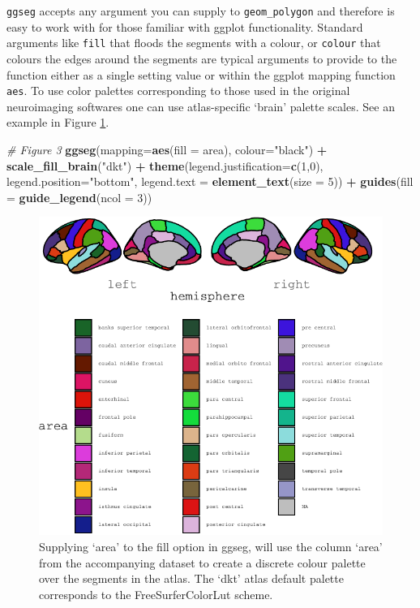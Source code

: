 \documentclass[fleqn,10pt]{wlpeerj} %
\newenvironment{Shaded}{\begin{snugshade}}{\end{snugshade}}
\newcommand{\CommentTok}[1]{\textcolor[rgb]{0.56,0.35,0.01}{\textit{#1}}}
\newcommand{\DataTypeTok}[1]{\textcolor[rgb]{0.13,0.29,0.53}{#1}}
\newcommand{\DecValTok}[1]{\textcolor[rgb]{0.00,0.00,0.81}{#1}}
\newcommand{\KeywordTok}[1]{\textcolor[rgb]{0.13,0.29,0.53}{\textbf{#1}}}
\newcommand{\NormalTok}[1]{#1}
\newcommand{\OperatorTok}[1]{\textcolor[rgb]{0.81,0.36,0.00}{\textbf{#1}}}
\newcommand{\StringTok}[1]{\textcolor[rgb]{0.31,0.60,0.02}{#1}}
\begin{document}
\texttt{ggseg} accepts any argument you can supply to \texttt{geom\_polygon} and therefore is easy to work with for those familiar with ggplot functionality.
Standard arguments like \texttt{fill} that floods the segments with a colour, or \texttt{colour} that colours the edges around the segments are typical arguments to provide to the function either as a single setting value or within the ggplot mapping function \texttt{aes}.
To use color palettes corresponding to those used in the original neuroimaging softwares one can use atlas-specific `brain' palette scales.
See an example in Figure \ref{fig:fill}.

\begin{Shaded}
\begin{Highlighting}[]
\CommentTok{# Figure 3}
\KeywordTok{ggseg}\NormalTok{(}\DataTypeTok{mapping=}\KeywordTok{aes}\NormalTok{(}\DataTypeTok{fill =}\NormalTok{ area), }\DataTypeTok{colour=}\StringTok{"black"}\NormalTok{) }\OperatorTok{+}
\StringTok{  }\KeywordTok{scale_fill_brain}\NormalTok{(}\StringTok{"dkt"}\NormalTok{) }\OperatorTok{+}
\StringTok{  }\KeywordTok{theme}\NormalTok{(}\DataTypeTok{legend.justification=}\KeywordTok{c}\NormalTok{(}\DecValTok{1}\NormalTok{,}\DecValTok{0}\NormalTok{),}
        \DataTypeTok{legend.position=}\StringTok{"bottom"}\NormalTok{,}
        \DataTypeTok{legend.text =} \KeywordTok{element_text}\NormalTok{(}\DataTypeTok{size =} \DecValTok{5}\NormalTok{)) }\OperatorTok{+}
\StringTok{  }\KeywordTok{guides}\NormalTok{(}\DataTypeTok{fill =} \KeywordTok{guide_legend}\NormalTok{(}\DataTypeTok{ncol =} \DecValTok{3}\NormalTok{))}
\end{Highlighting}
\end{Shaded}

\begin{figure}
\centering
\includegraphics{draft_2_files/figure-latex/fill-1.pdf}
\caption{\label{fig:fill}Supplying `area' to the fill option in ggseg, will use the column `area' from the accompanying dataset to create a discrete colour palette over the segments in the atlas. The `dkt' atlas default palette corresponds to the FreeSurferColorLut scheme.}
\end{figure}
\end{document}
